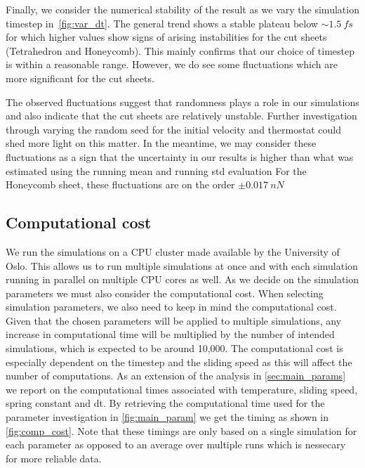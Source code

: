 Finally, we consider the numerical stability of the result as we vary the
simulation timestep in~\cref{fig:var_dt}. The general trend shows a stable
plateau below $\sim \SI{1.5}{fs}$ for which higher values show signs of arising
instabilities for the cut sheets (Tetrahedron and Honeycomb). This mainly
confirms that our choice of timestep is within a reasonable range. However, we
do see some fluctuations which are more significant for the cut sheets.

The observed fluctuations suggest that randomness plays a role in our simulations and also indicate that the cut sheets are relatively unstable. Further investigation through varying the random seed for the initial velocity and thermostat could shed more light on this matter. In the meantime, we may consider these fluctuations as a sign that the uncertainty in our results is higher than what was estimated using the running mean and running \acrshort{std} evaluation For the Honeycomb sheet, these fluctuations are on the order $\pm \SI{0.017}{nN}$ 



\subsection{Computational cost}
We run the simulations on a CPU cluster made available by the University of Oslo. This allows us to run multiple simulations at once and with each simulation running in parallel on multiple CPU cores as well. As we decide on the simulation parameters we must also consider the computational cost. When selecting simulation parameters, we also need to keep in mind the computational cost. Given that the chosen parameters will be applied to multiple simulations, any increase in computational time will be multiplied by the number of intended simulations, which is expected to be around 10,000. The computational cost is especially dependent on the timestep and the sliding speed as this will affect the number of computations. As an extension of the analysis in \cref{sec:main_params} we
report on the computational times associated with temperature, sliding speed,
spring constant and dt. By retrieving the computational time used for the
parameter investigation in \cref{fig:main_param} we get the timing as shown in
\cref{fig:comp_cost}. Note that these timings are only based on a single simulation for each parameter as opposed to an average over multiple runs which is
nessecary for more reliable data. 



